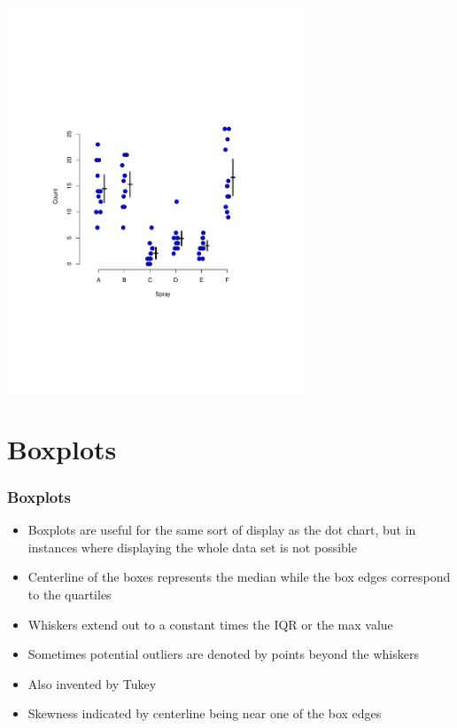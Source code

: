 \documentclass[aspectratio=169]{beamer}
\begin{document}
\begin{frame}
\includegraphics[width=3.5in]{dotPlot.pdf}
\end{frame}


\section{Boxplots}
\begin{frame}\frametitle{Boxplots}
\begin{itemize}
\item Boxplots are useful for the same sort of display as the dot
  chart, but in instances where displaying the whole data set is
  not possible
\item Centerline of the boxes represents the median while the 
  box edges correspond to the quartiles
\item Whiskers extend out to a constant times the IQR or the max value
\item Sometimes potential outliers are denoted by points beyond the whiskers
\item Also invented by Tukey
\item Skewness indicated by centerline being near one of the box edges
\end{itemize}
\end{frame}
\end{document}
